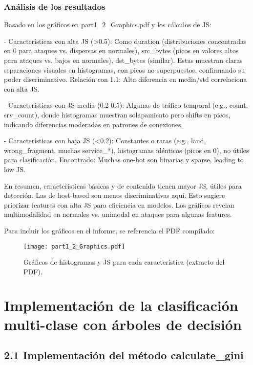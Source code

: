 \documentclass{article}
\begin{document}
\subsubsection{Análisis de los resultados}

Basado en los gráficos en part1\_2\_Graphics.pdf y los cálculos de JS:

- Características con alta JS (>0.5): Como duration (distribuciones concentradas en 0 para ataques vs. dispersas en normales), src\_bytes (picos en valores altos para ataques vs. bajos en normales), dst\_bytes (similar). Estas muestran claras separaciones visuales en histogramas, con picos no superpuestos, confirmando su poder discriminativo. Relación con 1.1: Alta diferencia en media/std correlaciona con alta JS.

- Características con JS media (0.2-0.5): Algunas de tráfico temporal (e.g., count, srv\_count), donde histogramas muestran solapamiento pero shifts en picos, indicando diferencias moderadas en patrones de conexiones.

- Características con baja JS (<0.2): Constantes o raras (e.g., land, wrong\_fragment, muchas service\_*), histogramas idénticos (picos en 0), no útiles para clasificación. Encontrado: Muchas one-hot son binarias y sparse, leading to low JS.

En resumen, características básicas y de contenido tienen mayor JS, útiles para detección. Las de host-based son menos discriminativas aquí. Esto sugiere priorizar features con alta JS para eficiencia en modelos. Los gráficos revelan multimodalidad en normales vs. unimodal en ataques para algunas features.

Para incluir los gráficos en el informe, se referencia el PDF compilado:

\begin{figure}[H]
\centering
\texttt{[image: part1\_2\_Graphics.pdf]}
\caption{Gráficos de histogramas y JS para cada característica (extracto del PDF).}
\label{fig:part12graphics}
\end{figure}

\section{Implementación de la clasificación multi-clase con árboles de decisión}

\subsection{2.1 Implementación del método calculate\_gini}
\end{document}
